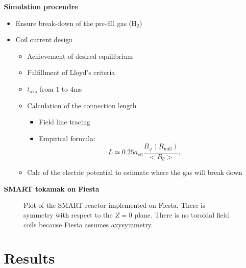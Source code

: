 \documentclass[10pt]{beamer}
\begin{document}
\begin{frame}{\bf Simulation proceudre}
	\begin{itemize}
		\item Ensure break-down of the pre-fill gas (H$_2$)
		\item Coil current design
		\begin{itemize}
			\item Achievement of desired equilibrium
			\item Fulfillment of Lloyd's criteria					\item $t_\text{ava}$ from 1 to 4ms
			\item Calculation of the connection length
			\begin{itemize}
				\item Field line tracing
				\item Empirical formula:
					\begin{equation}\label{ec L}
L \simeq 0.25 a_\text{eff}\dfrac{B_\varphi(R_{\text{null}})}{<B_\theta>},
					\end{equation}
			\end{itemize}
			\item Calc of the electric potential to estimate where the gas will break down
		\end{itemize}
	\end{itemize}
\end{frame}


\begin{frame}{\bf SMART tokamak on Fiesta}
	\begin{figure}[htbp]
	\centering
	\caption{Plot of the SMART reactor implemented on Fiesta. There is symmetry with respect to the $Z=0$ plane. There is no toroidal field coils because Fiesta assumes axysymmetry.}
	\end{figure}
\end{frame}


\section{Results}
\end{document}
